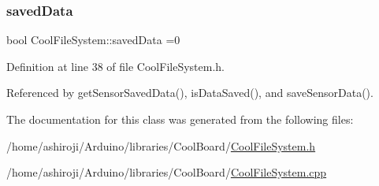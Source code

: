 \subsubsection{\texorpdfstring{saved\+Data}{savedData}}
{\footnotesize\ttfamily bool Cool\+File\+System\+::saved\+Data =0\hspace{0.3cm}{\ttfamily [private]}}



Definition at line 38 of file Cool\+File\+System.\+h.



Referenced by get\+Sensor\+Saved\+Data(), is\+Data\+Saved(), and save\+Sensor\+Data().



The documentation for this class was generated from the following files\+:\begin{DoxyCompactItemize}
\item 
/home/ashiroji/\+Arduino/libraries/\+Cool\+Board/\hyperlink{CoolFileSystem_8h}{Cool\+File\+System.\+h}\item 
/home/ashiroji/\+Arduino/libraries/\+Cool\+Board/\hyperlink{CoolFileSystem_8cpp}{Cool\+File\+System.\+cpp}\end{DoxyCompactItemize}
